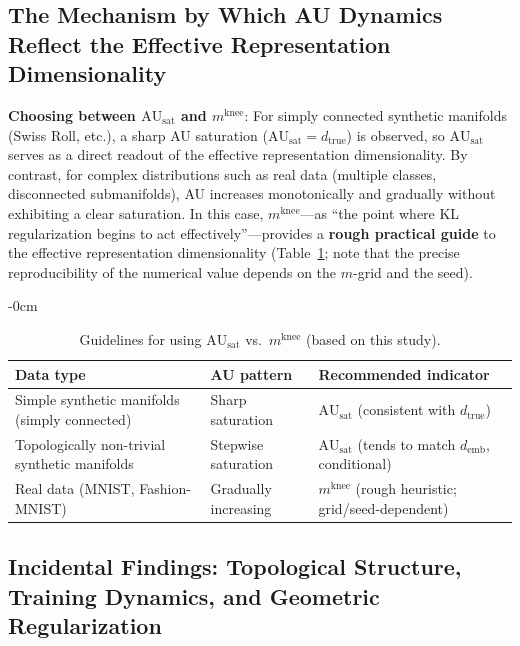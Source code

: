\documentclass[make,article,submit,pdftex,moreauthors]{Definitions/mdpi}
\newcommand{\dtrue}{d_{\mathrm{true}}}
\newcommand{\AUsat}{\mathrm{AU}_{\mathrm{sat}}}
\newcommand{\mknee}{m^{\mathrm{knee}}}
\newcommand{\demb}{d_{\mathrm{emb}}}
\begin{document}
\subsection{The Mechanism by Which AU Dynamics Reflect the Effective Representation Dimensionality}\label{sec:disc_au_dynamics}

\textbf{Choosing between $\AUsat$ and $\mknee$}:
For simply connected synthetic manifolds (Swiss Roll, etc.), a sharp AU saturation
($\AUsat = \dtrue$) is observed, so $\AUsat$ serves as a direct readout of the effective
representation dimensionality.
By contrast, for complex distributions such as real data (multiple classes, disconnected
submanifolds), AU increases monotonically and gradually without exhibiting a clear
saturation.
In this case, $\mknee$---as ``the point where KL regularization begins to act
effectively''---provides a \textbf{rough practical guide} to the effective representation
dimensionality (Table~\ref{tab:au_comparison}; note that the precise reproducibility of
the numerical value depends on the $m$-grid and the seed).

\begin{table}[H]
\begin{adjustwidth}{-\extralength}{0cm}
\centering
\caption{Guidelines for using $\AUsat$ vs.\ $\mknee$ (based on this study).}
\label{tab:au_comparison}
\small
\begin{tabular}{lll}
\toprule
Data type & AU pattern & Recommended indicator \\
\midrule
Simple synthetic manifolds (simply connected) & Sharp saturation & $\AUsat$ (consistent with $\dtrue$) \\
Topologically non-trivial synthetic manifolds & Stepwise saturation & $\AUsat$ (tends to match $\demb$, conditional) \\
Real data (MNIST, Fashion-MNIST) & Gradually increasing & $\mknee$ (rough heuristic; grid/seed-dependent) \\
\bottomrule
\end{tabular}
\end{adjustwidth}
\end{table}

\subsection{Incidental Findings: Topological Structure, Training Dynamics, and Geometric Regularization}\label{sec:disc_incidental}
\end{document}
